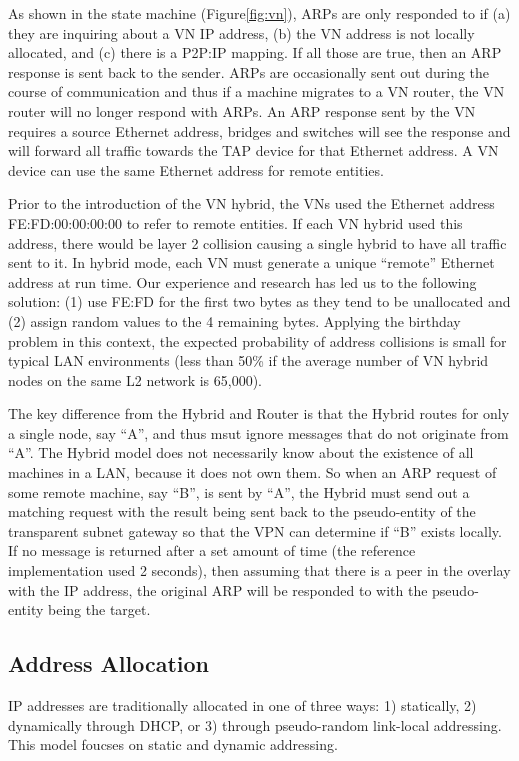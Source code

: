 As shown in the state machine (Figure\ref{fig:vn}), ARPs are only responded to
if (a) they are inquiring about a VN IP address, (b) the VN address is not
locally allocated, and (c) there is a P2P:IP mapping.  If all those are true,
then an ARP response is sent back to the sender.  ARPs are occasionally sent
out during the course of communication and thus if a machine migrates to a VN
router, the VN router will no longer respond with ARPs.  An ARP response sent
by the VN requires a source Ethernet address, bridges and switches will see the
response and will forward all traffic towards the TAP device for that Ethernet
address.  A VN device can use the same Ethernet address for remote entities.

Prior to the introduction of the VN hybrid, the VNs used the Ethernet address
FE:FD:00:00:00:00 to refer to remote entities.  If each VN hybrid used this
address, there would be layer 2 collision causing a single hybrid to have all
traffic sent to it.  In hybrid mode, each VN must generate a unique ``remote''
Ethernet address at run time.  Our experience and research has led us to the
following solution: (1) use FE:FD for the first two bytes as they tend to be
unallocated and (2) assign random values to the 4 remaining bytes.   Applying
the birthday problem in this context, the expected probability of address
collisions is small for typical LAN environments (less than 50\% if the average
number of VN hybrid nodes on the same L2 network is 65,000). 

The key difference from the Hybrid and Router is that the Hybrid routes for only
a single node, say ``A'', and thus msut ignore messages that do not originate
from ``A''.  The Hybrid model does not necessarily know about the existence of
all machines in a LAN, because it does not own them.  So when an ARP request
of some remote machine, say ``B'', is sent by ``A'', the Hybrid must send out
a matching request with the result being sent back to the pseudo-entity of the
transparent subnet gateway so that the VPN can determine if ``B'' exists
locally.  If no message is returned after a set amount of time (the reference
implementation used 2 seconds), then assuming that there is a peer in the
overlay with the IP address, the original ARP will be responded to with the
pseudo-entity being the target.

\subsection{Address Allocation}
IP addresses are traditionally allocated in one of three ways: 1) statically, 2)
dynamically through DHCP, or 3) through pseudo-random link-local addressing.
This model foucses on static and dynamic addressing.

